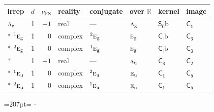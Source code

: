 \documentclass[10pt,a4paper]{article}
\newcommand{\needspace}[1]{\par\penalty-100\begingroup\dimen0=#1\relax\dimen2=\pagegoal
  \advance\dimen2-\pagetotal\ifdim\dimen0>\dimen2\relax\ifdim\dimen2>0pt\vfil\break\fi\fi
  \endgroup}
\numberwithin{equation}{section}
\newcommand{\grp}[1]{\mathsf{#1}}
\newcommand{\irr}[1]{\text{\normalfont\scshape #1}}
\newcommand{\conjpair}[1]{{}^{#1}}
\newcommand{\detbox}[1]{{\setlength{\fboxsep}{1pt}\fbox{#1}}}
\newcommand{\ptag}[1]{\mathrm{#1}}
\newcommand{\fsind}{\nu_{\mathrm{FS}}}
\newcommand{\secondclass}{\mathrm{b}}
\begin{document}
{\small\renewcommand{\arraystretch}{1.25}\setlength{\tabcolsep}{4pt}\begin{longtable}{@{}lrrlllll@{}}\toprule
irrep & $d$ & $\fsind$ & reality & conjugate & over $\mathbb{R}$ & kernel & image\\\midrule\endhead
\bottomrule\endfoot\endlastfoot
$\irr{a}_{\ptag{g}}$ & 1 & $+1$ & real & --- & $\irr{a}_{\ptag{g}}$ & \href{S6b.pdf}{$\grp{S_{6}}\secondclass$} & \href{../../../rotation/data/pdf/C1.pdf}{$\grp{C_{1}}$}\\*
$\conjpair{1}\irr{e}_{\ptag{g}}$ & 1 & $0$ & complex & $\conjpair{2}\irr{e}_{\ptag{g}}$ & $\irr{e}_{\ptag{g}}$ & \href{S2b.pdf}{$\grp{C_{i}}\secondclass$} & \href{../../../rotation/data/pdf/C3.pdf}{$\grp{C_{3}}$}\\*
$\conjpair{2}\irr{e}_{\ptag{g}}$ & 1 & $0$ & complex & $\conjpair{1}\irr{e}_{\ptag{g}}$ & $\irr{e}_{\ptag{g}}$ & \href{S2b.pdf}{$\grp{C_{i}}\secondclass$} & \href{../../../rotation/data/pdf/C3.pdf}{$\grp{C_{3}}$}\\*
\detbox{$\irr{a}_{\ptag{u}}$} & 1 & $+1$ & real & --- & $\irr{a}_{\ptag{u}}$ & \href{C3.pdf}{$\grp{C_{3}}$} & \href{../../../rotation/data/pdf/C2.pdf}{$\grp{C_{2}}$}\\*
$\conjpair{1}\irr{e}_{\ptag{u}}$ & 1 & $0$ & complex & $\conjpair{2}\irr{e}_{\ptag{u}}$ & $\irr{e}_{\ptag{u}}$ & \href{C1.pdf}{$\grp{C_{1}}$} & \href{../../../rotation/data/pdf/C6.pdf}{$\grp{C_{6}}$}\\*
$\conjpair{2}\irr{e}_{\ptag{u}}$ & 1 & $0$ & complex & $\conjpair{1}\irr{e}_{\ptag{u}}$ & $\irr{e}_{\ptag{u}}$ & \href{C1.pdf}{$\grp{C_{1}}$} & \href{../../../rotation/data/pdf/C6.pdf}{$\grp{C_{6}}$}\\
\bottomrule\end{longtable}}
\needspace{207pt}
\end{document}

